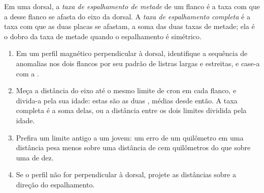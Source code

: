 \begin{omfigure}
\par{}
\label{fig:b1:plate-kinematics:stripes}
\end{omfigure}

\begin{definition}\label{def:b1:plate-kinematics:spreading-rate}
Em uma dorsal, a \emph{taxa de espalhamento de metade} de um
flanco é a taxa com que a  desse flanco se afasta do eixo da
dorsal. A \emph{taxa de espalhamento completa} é a taxa com que as
duas placas se afastam, a soma das duas taxas de metade; ela é o dobro da
taxa de metade quando o espalhamento é simétrico.
\end{definition}

\begin{method}\label{met:b1:plate-kinematics:rate}
\begin{enumerate}
  \item Em um perfil magnético perpendicular à dorsal, identifique a sequência
        de anomalias nos dois flancos por seu padrão de listras largas e estreitas,
        e case-a com a .
  \item Meça a distância do eixo até o mesmo limite de cron em cada flanco, e divida-a pela sua idade: estas são as duas ,
        médias desde então. A taxa completa é a soma delas, ou a distância entre os dois limites dividida pela idade.
  \item Prefira um limite antigo a um jovem: um erro de um quilômetro em uma
        distância pesa menos sobre uma distância de cem quilômetros do que sobre uma de dez.
  \item Se o perfil não for perpendicular à dorsal, projete as distâncias
        sobre a direção do espalhamento.
\end{enumerate}
\end{method}

